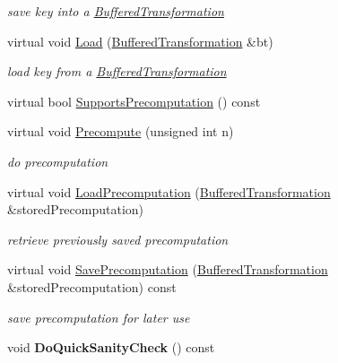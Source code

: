 \begin{DoxyCompactItemize}
\begin{DoxyCompactList}\small\item\em save key into a \hyperlink{class_buffered_transformation}{BufferedTransformation} \item\end{DoxyCompactList}\item 
virtual void \hyperlink{class_crypto_material_ae7a94de4c3d3822070db5babbdf8b113}{Load} (\hyperlink{class_buffered_transformation}{BufferedTransformation} \&bt)
\begin{DoxyCompactList}\small\item\em load key from a \hyperlink{class_buffered_transformation}{BufferedTransformation} \item\end{DoxyCompactList}\item 
virtual bool \hyperlink{class_crypto_material_a64ab4ff4adfcfc2da59706ac32895b50}{SupportsPrecomputation} () const 
\item 
virtual void \hyperlink{class_crypto_material_a39e512d2ea70d0e967db98c19994a7fd}{Precompute} (unsigned int n)
\begin{DoxyCompactList}\small\item\em do precomputation \item\end{DoxyCompactList}\item 
\hypertarget{class_crypto_material_a2911ebd9a28efa43dab71e5c12e2c90d}{
virtual void \hyperlink{class_crypto_material_a2911ebd9a28efa43dab71e5c12e2c90d}{LoadPrecomputation} (\hyperlink{class_buffered_transformation}{BufferedTransformation} \&storedPrecomputation)}
\label{class_crypto_material_a2911ebd9a28efa43dab71e5c12e2c90d}

\begin{DoxyCompactList}\small\item\em retrieve previously saved precomputation \item\end{DoxyCompactList}\item 
\hypertarget{class_crypto_material_a839d0f7f3e256b625caf6fd792925ad4}{
virtual void \hyperlink{class_crypto_material_a839d0f7f3e256b625caf6fd792925ad4}{SavePrecomputation} (\hyperlink{class_buffered_transformation}{BufferedTransformation} \&storedPrecomputation) const }
\label{class_crypto_material_a839d0f7f3e256b625caf6fd792925ad4}

\begin{DoxyCompactList}\small\item\em save precomputation for later use \item\end{DoxyCompactList}\item 
\hypertarget{class_crypto_material_a4229d3e3b7c91496cbd944c53336152d}{
void {\bfseries DoQuickSanityCheck} () const }
\label{class_crypto_material_a4229d3e3b7c91496cbd944c53336152d}

\end{DoxyCompactItemize}



